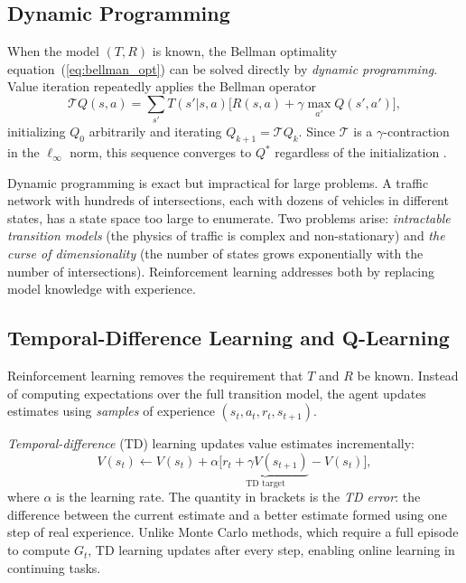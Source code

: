 \subsection{Dynamic Programming}
\label{sec:TheoreticalBackground_DPAndRL}

When the model $(T, R)$ is known, the Bellman optimality equation~(\ref{eq:bellman_opt}) can be solved directly by \emph{dynamic programming}. Value iteration repeatedly applies the Bellman operator
\begin{equation}
  \mathcal{T} Q(s,a) = \sum_{s'} T(s'|s,a)\bigl[R(s,a) + \gamma \max_{a'} Q(s',a')\bigr],
\end{equation}
initializing $Q_0$ arbitrarily and iterating $Q_{k+1} = \mathcal{T} Q_k$. Since $\mathcal{T}$ is a $\gamma$-contraction in the $\ell_\infty$ norm, this sequence converges to $Q^*$ regardless of the initialization \citep{sutton2018reinforcement}.

Dynamic programming is exact but impractical for large problems. A traffic network with hundreds of intersections, each with dozens of vehicles in different states, has a state space too large to enumerate. Two problems arise: \emph{intractable transition models} (the physics of traffic is complex and non-stationary) and \emph{the curse of dimensionality} (the number of states grows exponentially with the number of intersections). Reinforcement learning addresses both by replacing model knowledge with experience.

\subsection{Temporal-Difference Learning and Q-Learning}
\label{sec:TheoreticalBackground_TDLearning}

Reinforcement learning removes the requirement that $T$ and $R$ be known. Instead of computing expectations over the full transition model, the agent updates estimates using \emph{samples} of experience $(s_t, a_t, r_t, s_{t+1})$.

\emph{Temporal-difference} (TD) learning updates value estimates incrementally:
\begin{equation}
  V(s_t) \leftarrow V(s_t) + \alpha\bigl[\underbrace{r_t + \gamma V(s_{t+1})}_{\text{TD target}} - V(s_t)\bigr],
\end{equation}
where $\alpha$ is the learning rate. The quantity in brackets is the \emph{TD error}: the difference between the current estimate and a better estimate formed using one step of real experience. Unlike Monte Carlo methods, which require a full episode to compute $G_t$, TD learning updates after every step, enabling online learning in continuing tasks.

